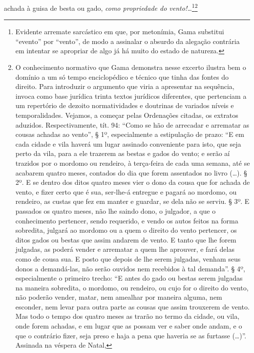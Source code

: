 achada à guisa de besta ou gado, \emph{como propriedade do
vento!\ldots{}}\footnote{Evidente arremate sarcástico em que, por
  metonímia, Gama substitui ``evento'' por ``vento'', de modo a assinalar o
  absurdo da alegação contrária em intentar se apropriar de algo já há
  muito do estado de natureza.}\footnote{O conhecimento normativo que
  Gama demonstra nesse excerto ilustra bem o domínio a um só tempo
  enciclopédico e técnico que tinha das fontes do direito. Para
  introduzir o argumento que viria a apresentar na sequência, invoca
  como base jurídica trinta textos jurídicos diferentes, que pertenciam
  a um repertório de dezoito normatividades e doutrinas de variados
  níveis e temporalidades.
  Vejamos, a começar pelas Ordenações citadas,
  os extratos aduzidos. Respectivamente, tít. 94: ``Como se hão de
  arrecadar e arrematar as cousas achadas ao vento'', § 1º,
  especialmente a estipulação de prazo: ``E em cada cidade e vila
  haverá um lugar assinado conveniente para isto, que seja perto da
  vila, para a ele trazerem as bestas e gados do vento; e serão aí
  trazidos por o mordomo ou rendeiro, à terça-feira de cada uma semana,
  até se acabarem quatro meses, contados do dia que forem assentados no
  livro (\ldots{}). § 2º. E se dentro dos ditos quatro meses vier o dono da
  cousa que for achada de vento, e fizer certo que é sua, ser-lhe-á
  entregue e pagará ao mordomo, ou rendeiro, as custas que fez em manter
  e guardar, se dela não se serviu. § 3º. E passados os quatro meses,
  não lhe saindo dono, o julgador, a que o conhecimento pertencer, sendo
  requerido, e vendo os autos feitos na forma sobredita, julgará ao
  mordomo ou a quem o direito do vento pertencer, os ditos gados ou
  bestas que assim andarem de vento. E tanto que lhe forem julgadas, as
  poderá vender e arrematar a quem lhe aprouver, e fará delas como de
  cousa sua. E posto que depois de lhe serem julgadas, venham seus donos
  a demandá-las, não serão ouvidos nem recebidos à tal demanda''. § 4º,
  especialmente o primeiro trecho: ``E antes do gado ou bestas serem
  julgadas na maneira sobredita, o mordomo, ou rendeiro, ou cujo for o
  direito do vento, não poderão vender, matar, nem amealhar por maneira
  alguma, nem esconder, nem levar para outra parte as cousas que assim
  trouxerem de vento. Mas todo o tempo dos quatro meses as trarão no
  termo da cidade, ou vila, onde forem achadas, e em lugar que as possam
  ver e saber onde andam, e o que o contrário fizer, seja preso e haja a
  pena que haveria se as furtasse (\ldots{})''. Assinada na véspera de Natal,
}
